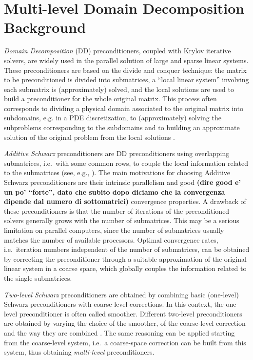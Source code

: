 \section{Multi-level Domain Decomposition Background\label{sec:background}}

\emph{Domain Decomposition} (DD) preconditioners, coupled with Krylov iterative
solvers, are widely used in the parallel solution of large and sparse linear systems.
These preconditioners are based on the divide and conquer technique: the matrix
to be preconditioned is divided into submatrices, a ``local linear system''
involving each submatrix is (approximately) solved, and the local solutions are used
to build a preconditioner for the whole original matrix. This process
often corresponds to dividing a physical domain associated to the original matrix
into subdomains, e.g. in a PDE discretization, to (approximately) solving the
subproblems corresponding to the subdomains and to building an approximate
solution of the original problem from the local solutions 
\cite{Cai_Widlund_92,dd1_94,dd2_96}. 

\emph{Additive Schwarz} preconditioners are DD preconditioners using overlapping
submatrices, i.e.\ with some common rows, to couple the local information
related to the submatrices (see, e.g., \cite{dd2_96}).
The main motivations for choosing Additive Schwarz preconditioners are their
intrinsic parallelism and good \textbf{(dire good e' un po' "`forte"', dato che
subito dopo diciamo che la convergenza dipende dal numero di sottomatrici)}
convergence properties. A drawback of these
preconditioners is that the number of iterations of the preconditioned solvers
generally grows with the number of submatrices. This may be a serious limitation
on parallel computers, since the number of submatrices usually matches the number
of available processors. Optimal convergence rates, i.e.\ iteration numbers
independent of the number of submatrices, can be obtained by correcting the
preconditioner through a suitable approximation of the original linear system
in a coarse space, which globally couples the information related to the single
submatrices. 

\emph{Two-level Schwarz} preconditioners are obtained
by combining basic (one-level) Schwarz preconditioners with coarse-level
corrections. In this context, the one-level preconditioner is often
called smoother. Different two-level preconditioners are obtained by varying the
choice of the smoother, of the coarse-level correction and the
way they are combined \cite{dd2_96}. The same reasoning can be applied starting
from the coarse-level system, i.e.\ a coarse-space correction can be built
from this system, thus obtaining \emph{multi-level} preconditioners.

